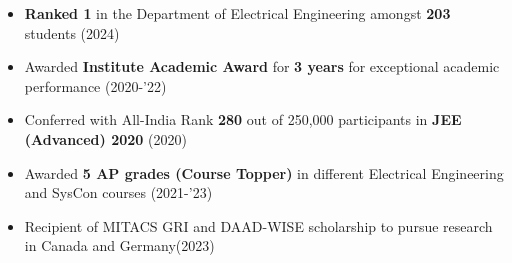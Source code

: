 \documentclass[10pt,letterpaper,sans]{moderncv}        %
\newcommand\x{1}
\newcommand\y{4}
\begin{document}
\begin{itemize}
    \item \textbf{Ranked 1} in the Department of Electrical Engineering amongst \textbf{203} students \hfill (2024)
    \item {Awarded \textbf{Institute Academic Award} for \textbf{3 years} for exceptional academic performance \hfill{{(2020-'22)}}} 
\item Conferred with All-India Rank \textbf{280} out of 250,000 participants in \textbf{JEE (Advanced) 2020} \hfill (2020)
\item Awarded \textbf{5 AP grades (Course Topper)} in different {Electrical Engineering and SysCon courses} \hfill (2021-'23)
\item Recipient of MITACS GRI and DAAD-WISE scholarship to pursue research in Canada and Germany\hfill (2023)
\end{itemize}





%



\vspace{-0.25 cm}
\end{document}
